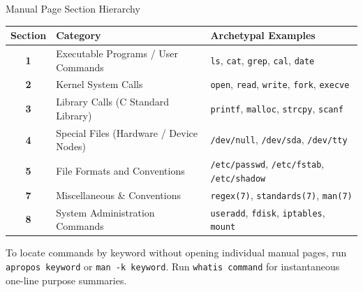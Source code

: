 \begin{syntaxbox}{Manual Page Section Hierarchy}
\begin{tabularx}{\linewidth}{c l X}
\toprule
\textbf{Section} & \textbf{Category} & \textbf{Archetypal Examples} \\
\midrule
\textbf{1} & Executable Programs / User Commands & \texttt{ls}, \texttt{cat}, \texttt{grep}, \texttt{cal}, \texttt{date} \\
\textbf{2} & Kernel System Calls & \texttt{open}, \texttt{read}, \texttt{write}, \texttt{fork}, \texttt{execve} \\
\textbf{3} & Library Calls (C Standard Library) & \texttt{printf}, \texttt{malloc}, \texttt{strcpy}, \texttt{scanf} \\
\textbf{4} & Special Files (Hardware / Device Nodes) & \texttt{/dev/null}, \texttt{/dev/sda}, \texttt{/dev/tty} \\
\textbf{5} & File Formats and Conventions & \texttt{/etc/passwd}, \texttt{/etc/fstab}, \texttt{/etc/shadow} \\
\textbf{7} & Miscellaneous \& Conventions & \texttt{regex(7)}, \texttt{standards(7)}, \texttt{man(7)} \\
\textbf{8} & System Administration Commands & \texttt{useradd}, \texttt{fdisk}, \texttt{iptables}, \texttt{mount} \\
\bottomrule
\end{tabularx}
\end{syntaxbox}

\begin{tipbox}
To locate commands by keyword without opening individual manual pages, run \texttt{apropos keyword} or \texttt{man -k keyword}. Run \texttt{whatis command} for instantaneous one-line purpose summaries.
\end{tipbox}
